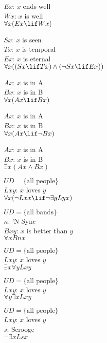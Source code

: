 \item {
$Ex$: $x$ ends well \\
$Wx$: $x$ is well \\
$ \forall x (Ex \lif Wx) $
}

\item {
$Sx$: $x$ is seen \\
$Tx$: $x$ is temporal \\
$Ex$: $x$ is eternal \\
$ \forall x ((Sx \lif Tx) \land (\lnot Sx \lif Ex)) $
}

\item {
$Ax$: $x$ is in A \\
$Bx$: $x$ is in B \\
$ \forall x (Ax \lif Bx) $
}

\item {
$Ax$: $x$ is in A \\
$Bx$: $x$ is in B \\
$ \forall x (Ax \lif \lnot Bx) $
}

\item {
$Ax$: $x$ is in A \\
$Bx$: $x$ is in B \\
$ \exists x (Ax \land Bx) $
}

\item {
$ UD = \{ \textrm{all people} \} $ \\
$Lxy$: $x$ loves $y$ \\
$ \forall x (\lnot Lxx \lif \lnot \exists y Lyx) $
}

\item {
$ UD = \{ \textrm{all bands} \} $ \\
$n$: 'N Sync \\
$Bxy$: $x$ is better than $y$ \\
$ \forall x Bnx $
}

\setcounter{enumi}{10}
\item {
$ UD = \{ \textrm{all people} \} $ \\
$Lxy$: $x$ loves $y$ \\
$ \exists x \forall y Lxy $
}

\item {
$ UD = \{ \textrm{all people} \} $ \\
$Lxy$: $x$ loves $y$ \\
$ \forall y \exists x Lxy $
}

\item {
$ UD = \{ \textrm{all people} \} $ \\
$Lxy$: $x$ loves $y$ \\
$s$: Scrooge \\
$ \lnot \exists x Lsx $
}

